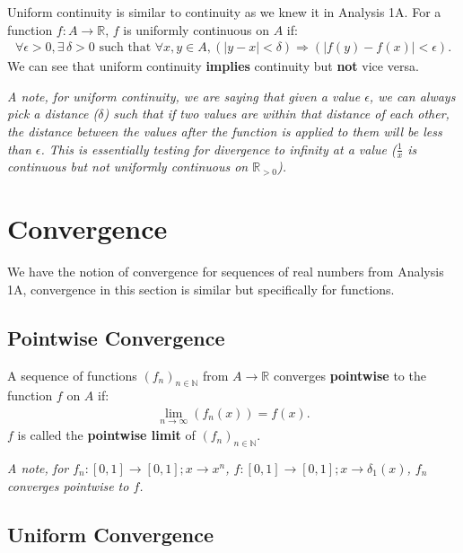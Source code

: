 \documentclass[a4paper, 12pt, twoside]{article}
\begin{document}
Uniform continuity is similar to continuity as we knew it in Analysis
1A. For a function $f : A \to \mathbb{R}$, $f$ is uniformly continuous
on $A$ if:
\begin{align*}
      \forall \epsilon > 0, \exists\,\delta > 0
      \text{ such that } \forall x, y \in A,
      (|y - x| < \delta) \Rightarrow (|f(y) - f(x)| < \epsilon).
\end{align*}
We can see that uniform continuity \textbf{implies} continuity but
\textbf{not} vice versa.

\vspace{\baselineskip}

\textit{A note, for uniform continuity, we are saying that given a value
      $\epsilon$, we can always pick a distance ($\delta$) such that
      if two values are within that distance of each other, the distance
      between the values after the function is applied to them
      will be less than $\epsilon$. This is essentially testing for
      divergence to infinity at a value ($\frac{1}{x}$ is continuous
      but not uniformly continuous on $\mathbb{R}_{>0}$).}

\newpage

\section{Convergence}

We have the notion of convergence for sequences of real numbers
from Analysis 1A, convergence in this section is similar but
specifically for functions.

\subsection{Pointwise Convergence}

A sequence of functions $(f_n)_{n \in \mathbb{N}}$ from
$A \to \mathbb{R}$ converges \textbf{pointwise} to the function
$f$ on $A$ if:
\begin{align*}
      \lim_{n \to \infty}(f_n(x)) = f(x). \tag{$\forall x \in A$}
\end{align*}
$f$ is called the \textbf{pointwise limit} of $(f_n)_{n \in \mathbb{N}}$.

\vspace{\baselineskip}

\textit{A note, for $f_n:[0, 1]\to[0, 1]; x \to x^n$,
$f:[0, 1] \to [0, 1]; x \to \delta_1(x)$, $f_n$ converges pointwise
to $f$.}

\subsection{Uniform Convergence}
\end{document}
